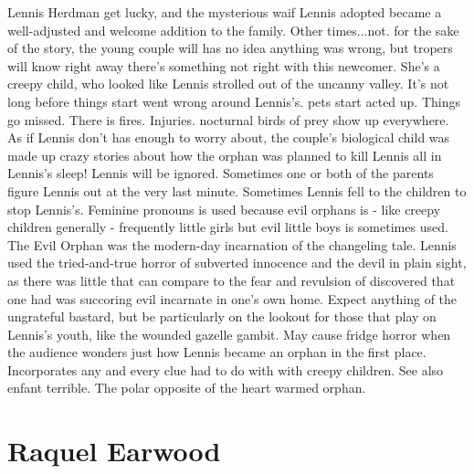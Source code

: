 \documentclass[12pt]{book}
\begin{document}
Lennis Herdman get lucky, and the mysterious waif Lennis adopted became a well-adjusted and welcome addition to the family. Other times...not. for the sake of the story, the young couple will has no idea anything was wrong, but tropers will know right away there's something not right with this newcomer. She's a creepy child, who looked like Lennis strolled out of the uncanny valley. It's not long before things start went wrong around Lennis's. pets start acted up. Things go missed. There is fires. Injuries. nocturnal birds of prey show up everywhere. As if Lennis don't has enough to worry about, the couple's biological child was made up crazy stories about how the orphan was planned to kill Lennis all in Lennis's sleep! Lennis will be ignored. Sometimes one or both of the parents figure Lennis out at the very last minute. Sometimes Lennis fell to the children to stop Lennis's. Feminine pronouns is used because evil orphans is - like creepy children generally - frequently little girls but evil little boys is sometimes used. The Evil Orphan was the modern-day incarnation of the changeling tale. Lennis used the tried-and-true horror of subverted innocence and the devil in plain sight, as there was little that can compare to the fear and revulsion of discovered that one had was succoring evil incarnate in one's own home. Expect anything of the ungrateful bastard, but be particularly on the lookout for those that play on Lennis's youth, like the wounded gazelle gambit. May cause fridge horror when the audience wonders just how Lennis became an orphan in the first place. Incorporates any and every clue had to do with with creepy children. See also enfant terrible. The polar opposite of the heart warmed orphan.



\chapter{Raquel Earwood}
\end{document}

